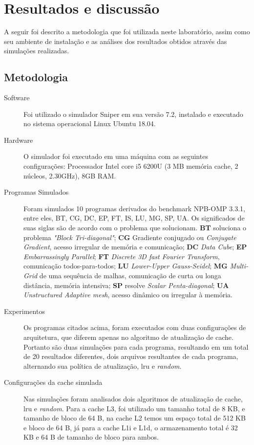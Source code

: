 \documentclass[12pt]{article}
\begin{document}
\section{Resultados e discussão}

A seguir foi descrito a metodologia que foi utilizada neste laboratório, assim como seu ambiente de instalação e as análises dos resultados obtidos através das simulações realizadas.

\subsection{Metodologia}
\begin{description}
\item[Software] Foi utilizado o simulador Sniper em sua versão 7.2, instalado e executado no sistema operacional Linux Ubuntu 18.04.
\item[Hardware] O simulador foi executado em uma máquina com as seguintes configurações: Processador Intel core i5 6200U (3 MB memória cache, 2 núcleos, 2.30GHz), 8GB RAM.
\item[Programas Simulados] Foram simulados 10 programas derivados do benchmark NPB-OMP 3.3.1, entre eles, BT, CG, DC, EP, FT, IS, LU, MG, SP, UA. Os significados de suas siglas são de acordo com o problema que solucionam. \textbf{BT} soluciona o problema \textit{"Block Tri-diagonal"}; \textbf{CG} Gradiente conjugado ou \textit{Conjugate Gradient}, acesso irregular de memória e comunicação; \textbf{DC} \textit{Data Cube}; \textbf{EP} \textit{Embarrassingly Parallel}; \textbf{FT} \textit{Discrete 3D fast Fourier Transform}, comunicação todos-para-todos; \textbf{LU} \textit{Lower-Upper Gauss-Seidel}; \textbf{MG} \textit{Multi-Grid} de uma sequência de malhas, comunicação de curta ou longa distância, memória intensiva; \textbf{SP} resolve \textit{Scalar Penta-diagonal}; \textbf{UA} \textit{Unstructured Adaptive mesh}, acesso dinâmico ou irregular à memória.

\item[Experimentos] Os programas citados acima, foram executados com duas configurações de arquitetura, que diferem apenas no algoritmo de atualização de cache. Portanto são duas simulações para cada programa, resultando em um total de 20 resultados diferentes, dois arquivos resultantes de cada programa, alternando sua política de atualização, lru e \textit{random}.

\item[Configurações da cache simulada] Nas simulações foram analisados dois algoritmos de atualização de cache, lru e \textit{random}. Para a cache L3, foi utilizado um tamanho total de 8 KB, e tamanho de bloco de 64 B, na cache L2 temos um espaço total de 512 KB e bloco de 64 B, já para a cache L1i e L1d, o armazenamento total é 32 KB e 64 B de tamanho de bloco para ambos.


\end{description}
\end{document}
